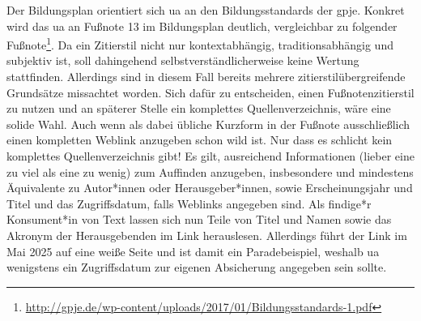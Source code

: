 Der Bildungsplan orientiert sich \gls{ua} an den Bildungsstandards der \gls{gpje}. Konkret wird das \gls{ua} an Fußnote 13 im Bildungsplan \autocite[][9]{bplan} deutlich, vergleichbar zu folgender Fußnote\footnote{\url{http://gpje.de/wp-content/uploads/2017/01/Bildungsstandards-1.pdf}}. Da ein Zitierstil nicht nur kontextabhängig, traditionsabhängig und subjektiv ist, soll dahingehend selbstverständlicherweise keine Wertung stattfinden. Allerdings sind in diesem Fall bereits mehrere zitierstilübergreifende Grundsätze missachtet worden. Sich dafür zu entscheiden, einen Fußnotenzitierstil zu nutzen und an späterer Stelle ein komplettes Quellenverzeichnis, wäre eine solide Wahl. Auch wenn als dabei übliche Kurzform in der Fußnote ausschließlich einen kompletten Weblink anzugeben schon wild ist. Nur dass es schlicht kein komplettes Quellenverzeichnis gibt!  
Es gilt, ausreichend Informationen (lieber eine zu viel als eine zu wenig) zum Auffinden anzugeben, insbesondere und mindestens Äquivalente zu Autor*innen oder Herausgeber*innen, sowie Erscheinungsjahr und Titel und das Zugriffsdatum, falls Weblinks angegeben sind. 
Als findige*r Konsument*in von Text lassen sich nun Teile von Titel und Namen sowie das Akronym der Herausgebenden im Link herauslesen. Allerdings führt der Link im Mai 2025 auf eine weiße Seite und ist damit ein Paradebeispiel, weshalb \gls{ua} wenigstens ein Zugriffsdatum zur eigenen Absicherung angegeben sein sollte.

